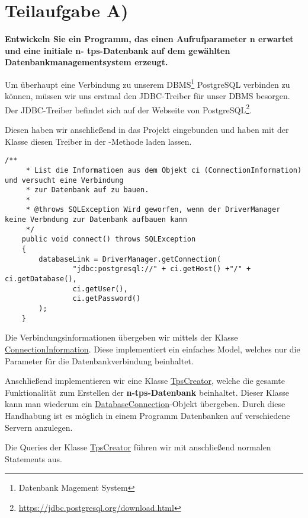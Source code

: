 \section{Teilaufgabe A)}
\textbf{Entwickeln Sie ein Programm, das einen Aufrufparameter n erwartet und eine initiale n-
tps-Datenbank auf dem gewählten Datenbankmanagementsystem erzeugt.}

Um überhaupt eine Verbindung zu unserem DBMS\footnote{Datenbank Magement
System} PostgreSQL verbinden zu können, müssen wir uns erstmal den JDBC-Treiber
für unser DBMS besorgen. Der JDBC-Treiber befindet sich auf der
Webseite von PostgreSQL\footnote{\url{https://jdbc.postgresql.org/download.html}}.

Diesen haben wir anschließend in das Projekt eingebunden und haben mit der
Klasse  diesen Treiber in der
-Methode laden lassen.

\begin{lstlisting}[caption={connect Funktion}]
	/**
	 * List die Informatioen aus dem Objekt ci (ConnectionInformation) und versucht eine Verbindung 
	 * zur Datenbank auf zu bauen.
	 * 
	 * @throws SQLException Wird geworfen, wenn der DriverManager keine Verbndung zur Datenbank aufbauen kann
	 */
	public void connect() throws SQLException
	{
		databaseLink = DriverManager.getConnection(
				"jdbc:postgresql://" + ci.getHost() +"/" + ci.getDatabase(),
				ci.getUser(), 
				ci.getPassword()
		);
	}
\end{lstlisting}

Die Verbindungsinformationen übergeben wir mittels der Klasse
\hyperref[lst:civ2]{ConnectionInformation}. Diese implementiert ein einfaches
Model, welches nur die Parameter für die Datenbankverbindung beinhaltet.

Anschließend implementieren wir eine Klasse \hyperref[lst:tpsv2]{TpsCreator},
welche die gesamte Funktionalität zum Erstellen der \textbf{n-tps-Datenbank} beinhaltet.
Dieser Klasse kann man wiederum ein
\hyperref[lst:dbv2]{DatabaseConnection}-Objekt übergeben. Durch diese Handhabung
ist es möglich in einem Programm Datenbanken auf verschiedene Servern anzulegen.

Die Queries der Klasse \hyperref[lst:tpsv2]{TpsCreator}
führen wir mit anschließend normalen Statements aus. 

